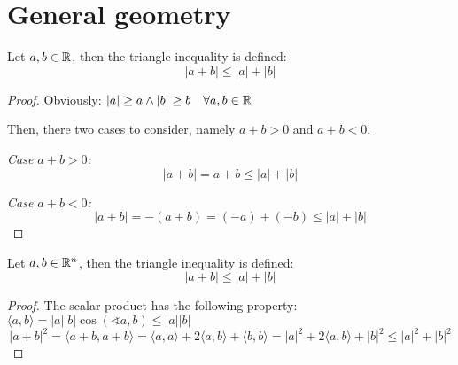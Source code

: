 \chapter{General geometry}

\begin{theorem}
    Let $a, b \in \mathbb{R}$, then the triangle inequality is defined:
    \begin{equation}
        |a + b| \le |a| + |b|
    \end{equation}
\end{theorem}
\begin{proof}
    Obviously: $|a| \ge a \wedge |b| \ge b \quad \forall a, b \in \mathbb{R}$
    
    Then, there two cases to consider, namely $a+b>0$ and $a+b<0$.

    \emph{Case $a+b>0$:}
    \begin{equation}
        |a + b| = a + b \le |a| + |b|
    \end{equation}

    \emph{Case $a+b<0$:}
    \begin{equation}
        |a + b| = -(a + b) = (-a) + (-b) \le |a| + |b|
    \end{equation}
\end{proof}

\begin{theorem}
    Let $a, b \in \mathbb{R}^n$, then the triangle inequality is defined:
    \begin{equation}
        |a + b| \le |a| + |b|
    \end{equation}
\end{theorem}
\begin{proof}
    The scalar product has the following property: $\langle a,b \rangle = |a||b|\cos(\sphericalangle a,b) \le |a||b|$
    \begin{equation}
        |a + b|^2 = \langle a+b,a+b \rangle 
                  = \langle a,a \rangle + 2 \langle a,b \rangle + \langle b,b \rangle
                  = |a|^2 + 2 \langle a,b \rangle + |b|^2
                  \le |a|^2 + |b|^2
    \end{equation}
\end{proof}

